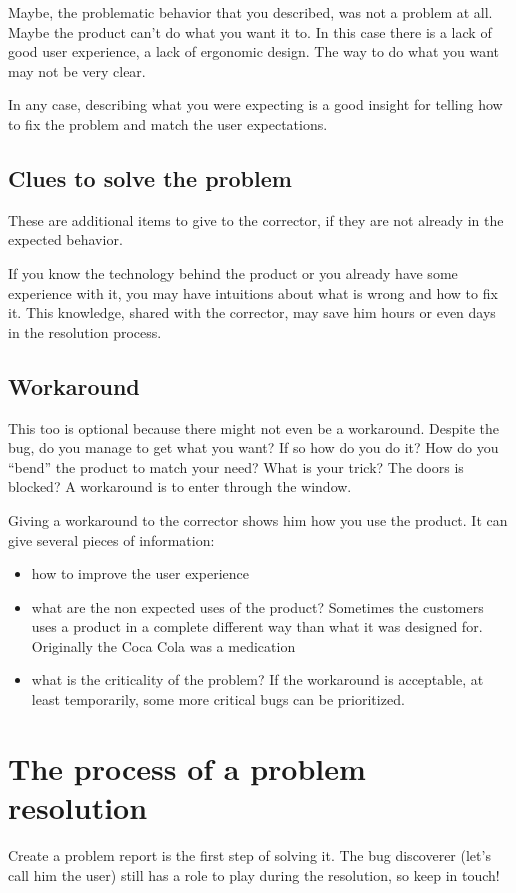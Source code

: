 Maybe, the problematic behavior that you described, was not a problem at all. Maybe the product can’t do what you want it to. In this case there is a lack of good user experience, a lack of ergonomic design. The way to do what you want may not be very clear.

In any case, describing what you were expecting is a good insight for telling how to fix the problem and match the user expectations.

\subsection{Clues to solve the problem}
These are additional items to give to the corrector, if they are not already in the expected behavior.

If you know the technology behind the product or you already have some experience with it, you may have intuitions about what is wrong and how to fix it. This knowledge, shared with the corrector, may save him hours or even days in the resolution process.

\subsection{Workaround}
This too is optional because there might not even be a workaround.
Despite the bug, do you manage to get what you want? If so how do you do it? How do you “bend” the product to match your need? What is your trick?
The doors is blocked? A workaround is to enter through the window.

Giving a workaround to the corrector shows him how you use the product. It can give several pieces of information:
\begin{itemize}
    \item how to improve the user experience
    \item what are the non expected uses of the product? Sometimes the customers uses a product in a complete different way than what it was designed for. Originally the Coca Cola was a medication
    \item what is the criticality of the problem? If the workaround is acceptable, at least temporarily, some more critical bugs can be prioritized.
\end{itemize}

\section{The process of a problem resolution}
Create a problem report is the first step of solving it. The bug discoverer (let’s call him the user) still has a role to play during the resolution, so keep in touch!

